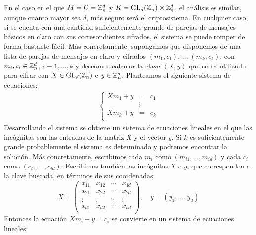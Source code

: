 En el caso en el que $M=C=\mathbb{Z}_n^d$ y $K=\operatorname{\rm GL}_d(\mathbb{Z}_n)\times\mathbb{Z}_n^d$, el análisis es similar, aunque cuanto mayor sea $d$, más seguro será el criptosistema. En cualquier caso, si se cuenta con una cantidad suficientemente grande de parejas de mensajes básicos en claro con sus corresondientes cifrados, el sistema se puede romper de forma bastante fácil. Más concretamente, supongamos que disponemos de una lista de parejas de mensajes en claro y cifrados $(m_1,c_1),\dots,(m_k,c_k)$, con $m_i,c_i\in\mathbb{Z}_n^d$, $i=1,\dots,k$ y deseamos calcular la clave $(X,y)$ que se ha utilizado para cifrar con $X\in\operatorname{\rm GL}_d(\mathbb{Z}_n)$ e $y\in\mathbb{Z}_n^d$. Planteamos el siguiente sistema de ecuaciones:
\begin{align*}
    \left\{
        \begin{array}{lcl}
             Xm_1 + y & =      & c_1 \\
                      & \vdots & \\
             Xm_k + y & =      & c_k \\
        \end{array}
    \right.
\end{align*}
Desarrollando el sistema se obtiene un sistema de ecuaciones lineales en el que las incógnitas son las entradas de la matriz $X$ y el vector $y$. Si $k$ es suficientemente grande probablemente el sistema es determinado y podremos encontrar la solución. Más concretamente, escribimos cada $m_i$ como $(m_{i1},\dots,m_{id})$ y cada $c_i$ como $(c_{i1},\dots,c_{id})$. Escribimos también las incógnitas $X$ e $y$, que corresponden a la clave buscada, en términos de sus coordenadas:
$$X=\begin{pmatrix}
    x_{11} & x_{12} & \cdots & x_{1d} \\
    x_{21} & x_{22} & \cdots & x_{2d} \\
    \vdots & \vdots & \ddots & \vdots \\
    x_{d1} & x_{d2} & \cdots & x_{dd} \\
\end{pmatrix}, \quad y=(y_1,\dots,y_d)$$
Entonces la ecuación $Xm_i + y = c_i$ se convierte en un sistema de ecuaciones lineales:
